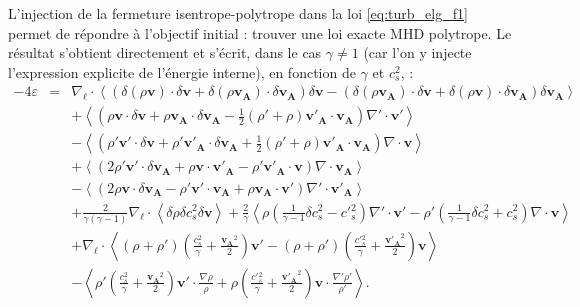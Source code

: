  L'injection de la fermeture isentrope-polytrope dans la loi \eqref{eq:turb_elg_f1} permet de répondre à l'objectif initial : trouver une loi exacte \ac{MHD} polytrope. Le résultat s'obtient directement et s'écrit, dans le cas $\gamma \neq 1$ (car l'on y injecte l'expression explicite de l'énergie interne), en fonction de $\gamma$ et $c^2_s$, : 
\begin{equation}
\label{eq:turb_elpol_f1}
\boxed{
\begin{array}{rcl}
-4\varepsilon &=& \nabla_{\boldsymbol{\ell}} \cdot \left<\left(\delta \left(\rho\boldsymbol{v}\right) \cdot \delta \boldsymbol{v}+ \delta \left(\rho\boldsymbol{v_A}\right) \cdot \delta \boldsymbol{v_A} \right)\delta \boldsymbol{v}  -\left(\delta \left(\rho\boldsymbol{v_A}\right) \cdot \delta \boldsymbol{v}  + \delta \left(\rho\boldsymbol{v}\right) \cdot \delta \boldsymbol{v_A}  \right) \delta \boldsymbol{v_A} \right>\\
&& +\left< \left(\rho \boldsymbol{v} \cdot \delta \boldsymbol{v} +\rho \boldsymbol{v_A} \cdot \delta \boldsymbol{v_A} -\frac{1}{2} \left(\rho'+\rho\right) \boldsymbol{v'_A} \cdot \boldsymbol{v_A} \right) \nabla' \cdot \boldsymbol{v'} \right>\\
&& -\left< \left(\rho' \boldsymbol{v'} \cdot \delta \boldsymbol{v} + \rho' \boldsymbol{v'_A} \cdot \delta \boldsymbol{v_A} + \frac{1}{2} \left(\rho'+\rho\right) \boldsymbol{v'_A} \cdot \boldsymbol{v_A}  \right)\nabla \cdot \boldsymbol{v}\right>\\
&&+ \left<\left(2 \rho' \boldsymbol{v'} \cdot \delta \boldsymbol{v_A}+\rho \boldsymbol{v} \cdot \boldsymbol{v'_A} - \rho' \boldsymbol{v'_A} \cdot \boldsymbol{v}  \right)\nabla \cdot \boldsymbol{v_A}\right>\\
&&- \left<\left(2\rho \boldsymbol{v} \cdot \delta \boldsymbol{v_A} -\rho' \boldsymbol{v'} \cdot \boldsymbol{v_A} +  \rho \boldsymbol{v_A} \cdot \boldsymbol{v'} \right)\nabla' \cdot \boldsymbol{v'_A}\right> \\
&&+ \frac{2}{\gamma\left(\gamma-1\right)} \nabla_{\boldsymbol{\ell}} \cdot \left<\delta \rho  \delta c^2_s \delta \boldsymbol{v}\right> + \frac{2}{\gamma} \left<\rho \left(\frac{1}{\gamma-1} \delta c^2_s - c'{}^2_s\right)\nabla' \cdot \boldsymbol{v'}  - \rho' \left(\frac{1}{\gamma-1}\delta c^2_s + c^2_s\right) \nabla \cdot \boldsymbol{v} \right>\\
&&+  \nabla_{\boldsymbol{\ell}} \cdot \left< \left(\rho+\rho'\right) \left(\frac{c^2_s}{\gamma}+\frac{\boldsymbol{v_A}^2}{2}\right) \boldsymbol{v'} -  \left(\rho+\rho'\right) \left(\frac{c'{}^2_s}{\gamma}+\frac{\boldsymbol{v'_A}^2}{2}\right)  \boldsymbol{v} \right>\\
&&- \left<\rho' \left(\frac{c^2_s}{\gamma}+\frac{\boldsymbol{v_A}^2}{2}\right)  \boldsymbol{v'} \cdot \frac{\nabla \rho}{\rho} + \rho \left(\frac{c'{}^2_s}{\gamma}+\frac{\boldsymbol{v'_A}^2}{2}\right)  \boldsymbol{v} \cdot \frac{\nabla' \rho'}{\rho'} \right>.
\end{array}}
\end{equation} 
